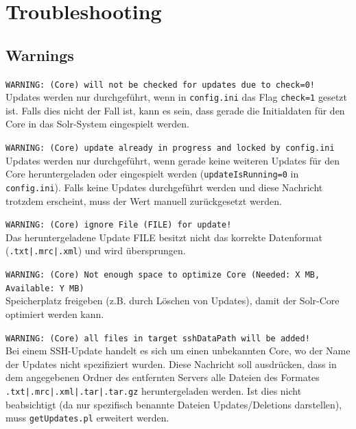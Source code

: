 \documentclass[10pt]{article}
\begin{document}

\newpage
\section{Troubleshooting}
\subsection{Warnings}
\texttt{WARNING: (Core) will not be checked for updates due to check=0!}\\
Updates werden nur durchgeführt, wenn in \texttt{config.ini} das Flag \texttt{check=1} gesetzt ist. Falls dies nicht der Fall ist, kann es sein, dass gerade die Initialdaten für den Core in das Solr-System eingespielt werden.

\texttt{WARNING: (Core) update already in progress and locked by config.ini}\\
Updates werden nur durchgeführt, wenn gerade keine weiteren Updates für den Core heruntergeladen oder eingespielt werden (\texttt{updateIsRunning=0} in \texttt{config.ini}). Falls keine Updates durchgeführt werden und diese Nachricht trotzdem erscheint, muss der Wert manuell zurückgesetzt werden.

\texttt{WARNING: (Core) ignore File (FILE) for update!}\\
Das heruntergeladene Update FILE besitzt nicht das korrekte Datenformat (\texttt{.txt|.mrc|.xml}) und wird übersprungen.
 
\texttt{WARNING: (Core) Not enough space to optimize Core (Needed: X MB, Available: Y MB)} \\
Speicherplatz freigeben (z.B. durch Löschen von Updates), damit der Solr-Core optimiert werden kann.

\texttt{WARNING: (Core) all files in target sshDataPath will be added!} \\ 
Bei einem SSH-Update handelt es sich um einen unbekannten Core, wo der Name der Updates nicht spezifiziert wurden. Diese Nachricht soll ausdrücken, dass in dem angegebenen Ordner des entfernten Servers alle Dateien des Formates \texttt{.txt|.mrc|.xml|.tar|.tar.gz} heruntergeladen werden. Ist dies nicht beabsichtigt (da nur spezifisch benannte Dateien Updates/Deletions darstellen), muss \texttt{getUpdates.pl} erweitert werden.
\end{document}
